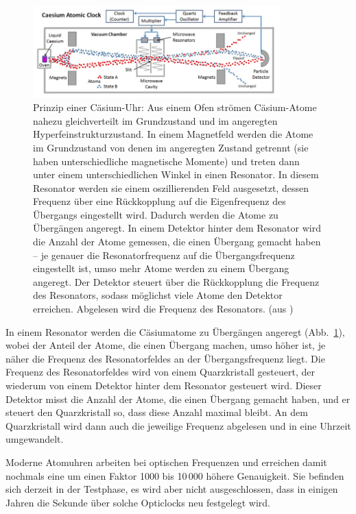 \begin{figure}[htb]
\includegraphics[width=0.85\textwidth]{./Bilder/Atomic_Clock.jpg}
\caption{\label{fig_Atomuhr}%
Prinzip einer C\"asium-Uhr: Aus einem Ofen str\"omen C\"asium-Atome nahezu gleichverteilt im
Grundzustand und im angeregten Hyperfeinstrukturzustand. In einem Magnetfeld werden die
Atome im Grundzustand von denen im angeregten Zustand getrennt (sie haben unterschiedliche
magnetische Momente) und treten dann unter einem unterschiedlichen Winkel in einen
Resonator. In diesem Resonator werden sie einem oszillierenden Feld ausgesetzt, dessen Frequenz
\"uber eine R\"uckkopplung auf die Eigenfrequenz des \"Ubergangs eingestellt wird. Dadurch werden die
Atome zu \"Uberg\"angen angeregt. In einem Detektor hinter dem Resonator wird die Anzahl der Atome
gemessen, die einen \"Ubergang gemacht haben -- je genauer die Resonatorfrequenz auf die
\"Ubergangsfrequenz eingestellt ist, umso mehr Atome werden zu einem \"Ubergang angeregt. Der
Detektor steuert \"uber die R\"uckkopplung die Frequenz des Resonators, sodass m\"oglichst viele
Atome den Detektor erreichen. Abgelesen wird die Frequenz des Resonators. (aus \cite{Atomuhr})}   
\end{figure}

In einem Resonator werden die C\"asiumatome zu \"Uberg\"angen angeregt (Abb.\ \ref{fig_Atomuhr}), wobei
der Anteil der Atome, die einen \"Ubergang machen, umso h\"oher ist, je n\"aher die Frequenz des
Resonatorfeldes an der \"Ubergangsfrequenz liegt. Die Frequenz des Resonatorfeldes wird von einem
Quarzkristall gesteuert, der wiederum von einem Detektor hinter dem Resonator gesteuert wird. 
Dieser Detektor misst die Anzahl der Atome, die einen \"Ubergang gemacht haben, und er steuert den
Quarzkristall so, dass diese Anzahl maximal bleibt. An dem Quarzkristall wird dann auch die jeweilige
Frequenz abgelesen und in eine Uhrzeit umgewandelt. 

Moderne 
Atomuhren arbeiten bei optischen Frequenzen und erreichen damit nochmals eine um
einen Faktor 1000 bis 10\,000 h\"ohere Genauigkeit. Sie befinden sich derzeit in der Testphase,
es wird aber nicht ausgeschlossen, dass in einigen Jahren die Sekunde \"uber solche Opticlocks
neu festgelegt wird. 

